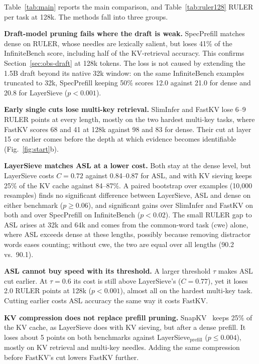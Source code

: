 \documentclass[10pt,conference]{IEEEtran}
\begin{document}
Table~\ref{tab:main} reports the main comparison, and Table~\ref{tab:ruler128} RULER per task at 128k. The methods fall into three groups.

\textbf{Draft-model pruning fails where the draft is weak.} SpecPrefill matches dense on RULER, whose needles are lexically salient, but loses 41\% of the InfiniteBench score, including half of the KV-retrieval accuracy. This confirms Section~\ref{sec:obs-draft} at 128k tokens. The loss is not caused by extending the 1.5B draft beyond its native 32k window: on the same InfiniteBench examples truncated to 32k, SpecPrefill keeping 50\% scores 12.0 against 21.0 for dense and 20.8 for LayerSieve ($p<0.001$).

\textbf{Early single cuts lose multi-key retrieval.} SlimInfer and FastKV lose 6--9 RULER points at every length, mostly on the two hardest multi-key tasks, where FastKV scores 68 and 41 at 128k against 98 and 83 for dense. Their cut at layer 15 or earlier comes before the depth at which evidence becomes identifiable (Fig.~\ref{fig:start}b).

\textbf{LayerSieve matches ASL at a lower cost.} Both stay at the dense level, but LayerSieve costs $C=0.72$ against 0.84--0.87 for ASL, and with KV sieving keeps 25\% of the KV cache against 84--87\%. A paired bootstrap over examples (10{,}000 resamples) finds no significant difference between LayerSieve, ASL and dense on either benchmark ($p\ge0.06$), and significant gains over SlimInfer and FastKV on both and over SpecPrefill on InfiniteBench ($p<0.02$). The small RULER gap to ASL arises at 32k and 64k and comes from the common-word task (cwe) alone, where ASL exceeds dense at these lengths, possibly because removing distractor words eases counting; without cwe, the two are equal over all lengths (90.2 vs.\ 90.1).

\textbf{ASL cannot buy speed with its threshold.} A larger threshold $\tau$ makes ASL cut earlier. At $\tau=0.6$ its cost is still above LayerSieve's ($C=0.77$), yet it loses 2.0 RULER points at 128k ($p<0.001$), almost all on the hardest multi-key task. Cutting earlier costs ASL accuracy the same way it costs FastKV.

\textbf{KV compression does not replace prefill pruning.} SnapKV~\cite{li2024snapkv} keeps 25\% of the KV cache, as LayerSieve does with KV sieving, but after a dense prefill. It loses about 5 points on both benchmarks against LayerSieve$_{\text{prefill}}$ ($p\le0.004$), mostly on KV retrieval and multi-key needles. Adding the same compression before FastKV's cut lowers FastKV further.
\end{document}
